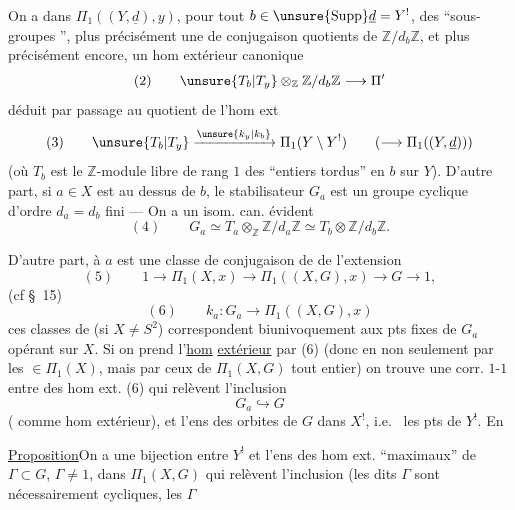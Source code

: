 On a dans $\Pi_1((Y,\underline d),y)$, pour tout
$b\in\unsure{\operatorname{Supp}}\underline d=Y^!$,
des ``sous-groupes '', plus précisément
une  de conjugaison  
quotients de $\mathbb Z/d_b\mathbb Z$, et plus précisément encore,
un hom extérieur canonique
\[
(2)\qquad
\unsure{T_b|T_y}\otimes_{\mathbb Z}\mathbb Z/d_b\mathbb Z
\longrightarrow\Pi'
\]
déduit par passage au quotient de l'hom ext
\[
(3)\qquad
\unsure{T_b|T_y}\xrightarrow{\unsure{k_y|k_b}}
\Pi_1(Y\setminus Y^!)
\qquad(\longrightarrow\Pi_1((Y,\underline d)))
\]
(où $T_b$ est le $\mathbb Z$-module libre de rang $1$ des
``entiers tordus'' en $b$ sur $Y$). D'autre part,
si $a\in X$ est au dessus de $b$, le stabilisateur $G_a$ est
 un groupe cyclique d'ordre $d_a=d_b$
fini --- On a \unsure{$=$} un isom. can. évident
\[
(4)\qquad
G_a\simeq T_a\otimes_{\mathbb Z}\mathbb Z/d_a\mathbb Z
\simeq T_b\otimes\mathbb Z/d_b\mathbb Z.
\]


D'autre part, à $a$ est  une classe de
conjugaison de  de l'extension
\[
(5)\qquad
1\longrightarrow\Pi_1(X,x)\longrightarrow\Pi_1((X,G),x)
\longrightarrow G\longrightarrow1,
\]
(cf \S\ 15)
\[
(6)\qquad
k_a:G_a\longrightarrow\Pi_1((X,G),x)
\]
ces classes 
de  (si $X\ne S^2$) correspondent
biunivoquement aux pts fixes de $G_a$ opérant sur $X$.
Si on prend l'\uline{hom} \uline{extérieur} 
par (6) (donc en  non seulement par les
$\in\Pi_1(X)$, mais par ceux de $\Pi_1(X,G)$ tout entier)
on trouve une corr. $1$-$1$ entre 
des hom ext. (6) qui relèvent l'inclusion
\[
G_a\hookrightarrow G
\]
( comme hom extérieur), et l'ens des orbites de $G$
dans $X^!$, i.e.\  les pts de $Y^!$. En 

\uline{Proposition}\quad On a une bijection entre $Y^!$
et l'ens des hom ext. ``maximaux''
de  $\Gamma\subset G$, 
$\Gamma\ne1$, dans $\Pi_1(X,G)$ qui relèvent l'inclusion
 (les dits $\Gamma$ sont nécessairement
cycliques, les $\Gamma$


